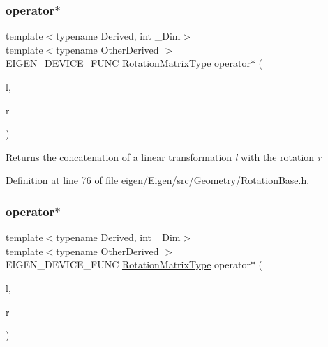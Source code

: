 \subsubsection{\texorpdfstring{operator$\ast$}{operator*}\hspace{0.1cm}{\footnotesize\ttfamily [1/4]}}
{\footnotesize\ttfamily template$<$typename Derived, int \+\_\+\+Dim$>$ \\
template$<$typename Other\+Derived $>$ \\
E\+I\+G\+E\+N\+\_\+\+D\+E\+V\+I\+C\+E\+\_\+\+F\+U\+NC \hyperlink{class_eigen_1_1_rotation_base_a83602509674c9d635551998460342951}{Rotation\+Matrix\+Type} operator$\ast$ (\begin{DoxyParamCaption}\item[{const \hyperlink{group___core___module_struct_eigen_1_1_eigen_base}{Eigen\+Base}$<$ Other\+Derived $>$ \&}]{l,  }\item[{const Derived \&}]{r }\end{DoxyParamCaption})\hspace{0.3cm}{\ttfamily [friend]}}

\begin{DoxyReturn}{Returns}
the concatenation of a linear transformation {\itshape l} with the rotation {\itshape r} 
\end{DoxyReturn}


Definition at line \hyperlink{eigen_2_eigen_2src_2_geometry_2_rotation_base_8h_source_l00076}{76} of file \hyperlink{eigen_2_eigen_2src_2_geometry_2_rotation_base_8h_source}{eigen/\+Eigen/src/\+Geometry/\+Rotation\+Base.\+h}.

\mbox{\label{class_eigen_1_1_rotation_base_affba3749838de939140b601e7db834e8}} 
\subsubsection{\texorpdfstring{operator$\ast$}{operator*}\hspace{0.1cm}{\footnotesize\ttfamily [2/4]}}
{\footnotesize\ttfamily template$<$typename Derived, int \+\_\+\+Dim$>$ \\
template$<$typename Other\+Derived $>$ \\
E\+I\+G\+E\+N\+\_\+\+D\+E\+V\+I\+C\+E\+\_\+\+F\+U\+NC \hyperlink{class_eigen_1_1_rotation_base_a83602509674c9d635551998460342951}{Rotation\+Matrix\+Type} operator$\ast$ (\begin{DoxyParamCaption}\item[{const \hyperlink{group___core___module_struct_eigen_1_1_eigen_base}{Eigen\+Base}$<$ Other\+Derived $>$ \&}]{l,  }\item[{const Derived \&}]{r }\end{DoxyParamCaption})\hspace{0.3cm}{\ttfamily [friend]}}

